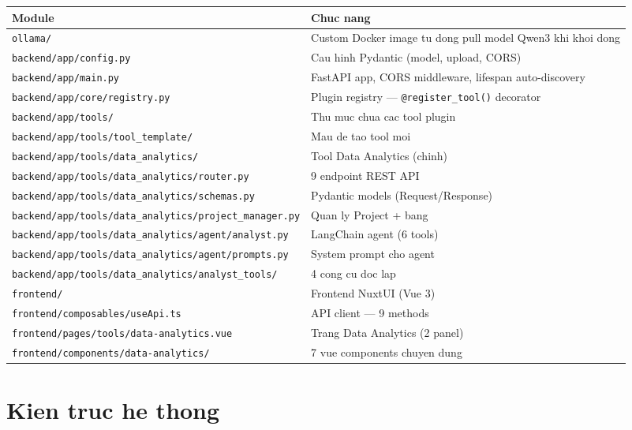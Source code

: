 \documentclass[12pt,a4paper]{article}
\begin{document}
\begin{tabularx}{\textwidth}{lX}
\toprule
\bfseries Module & \bfseries Chuc nang \\
\midrule
\texttt{ollama/} & Custom Docker image tu dong pull model Qwen3 khi khoi dong \\
\texttt{backend/app/config.py} & Cau hinh Pydantic (model, upload, CORS) \\
\texttt{backend/app/main.py} & FastAPI app, CORS middleware, lifespan auto-discovery \\
\texttt{backend/app/core/registry.py} & Plugin registry --- \texttt{@register\_tool()} decorator \\
\texttt{backend/app/tools/} & Thu muc chua cac tool plugin \\
\texttt{backend/app/tools/tool\_template/} & Mau de tao tool moi \\
\texttt{backend/app/tools/data\_analytics/} & Tool Data Analytics (chinh) \\
\texttt{backend/app/tools/data\_analytics/router.py} & 9 endpoint REST API \\
\texttt{backend/app/tools/data\_analytics/schemas.py} & Pydantic models (Request/Response) \\
\texttt{backend/app/tools/data\_analytics/project\_manager.py} & Quan ly Project + bang \\
\texttt{backend/app/tools/data\_analytics/agent/analyst.py} & LangChain agent (6 tools) \\
\texttt{backend/app/tools/data\_analytics/agent/prompts.py} & System prompt cho agent \\
\texttt{backend/app/tools/data\_analytics/analyst\_tools/} & 4 cong cu doc lap \\
\texttt{frontend/} & Frontend NuxtUI (Vue 3) \\
\texttt{frontend/composables/useApi.ts} & API client --- 9 methods \\
\texttt{frontend/pages/tools/data-analytics.vue} & Trang Data Analytics (2 panel) \\
\texttt{frontend/components/data-analytics/} & 7 vue components chuyen dung \\
\bottomrule
\end{tabularx}

\section{Kien truc he thong}
\end{document}
